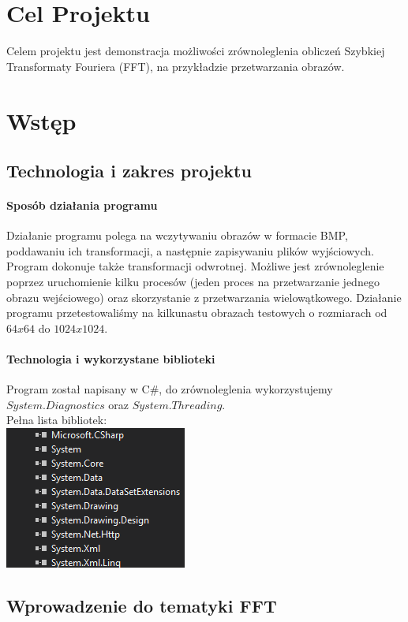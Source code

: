 \section{Cel Projektu}
Celem projektu jest demonstracja możliwości zrównoleglenia obliczeń Szybkiej Transformaty Fouriera (FFT), na przykładzie przetwarzania obrazów.
\section{Wstęp}
\subsection{Technologia i zakres projektu}
\paragraph{Sposób działania programu}
Działanie programu polega na wczytywaniu obrazów w formacie BMP, poddawaniu ich
transformacji, a następnie zapisywaniu plików wyjściowych. Program dokonuje także transformacji odwrotnej. Możliwe jest zrównoleglenie poprzez uruchomienie kilku procesów (jeden proces na przetwarzanie jednego obrazu wejściowego) oraz skorzystanie z przetwarzania wielowątkowego. Działanie programu przetestowaliśmy na kilkunastu obrazach testowych o rozmiarach od $ 64x64 $ do $ 1024x1024 $.
\paragraph{Technologia i wykorzystane biblioteki}Program został napisany w C\#, do zrównoleglenia wykorzystujemy $ System.Diagnostics $ oraz $ System.Threading $.\\
 Pełna lista bibliotek:\\
 
\includegraphics[scale=1]{figures/bibl.png}
\subsection{Wprowadzenie do tematyki FFT}

